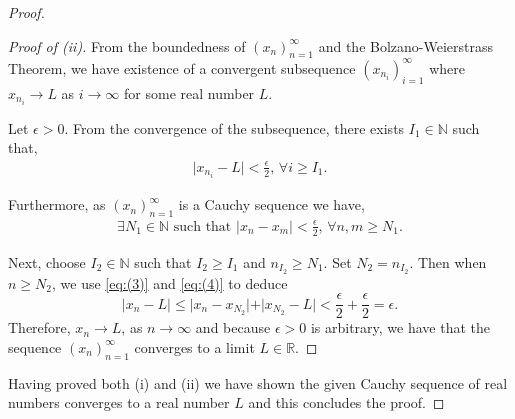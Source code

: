 \documentclass{article}
\begin{document}
\begin{proof}
\begin{proof}[Proof of (ii)]
From the boundedness of $(x_{n})_{n=1}^{\infty}$ and the Bolzano-Weierstrass Theorem, we have existence of a convergent subsequence $(x_{n_{i}})_{i=1}^{\infty}$ where $x_{n_{i}}\to L$ as $i\to\infty$ for some real number $L$. 

Let $\epsilon > 0$. From the convergence of the subsequence, there exists $I_{1}\in\mathbb{N}$ such that, 
\begin{align}
\vert x_{n_{i}}-L\vert<\frac{\epsilon}{2}\text{, }\forall i\geq I_{1}\text{.}\label{eq:(3)}\tag{3}
\end{align}

Furthermore, as $(x_{n})_{n=1}^{\infty}$ is a Cauchy sequence we have,
\begin{align}
\exists N_{1}\in\mathbb{N} \text{ such that } \vert x_{n}-x_{m}\vert< \frac{\epsilon}{2}\text{, } \forall n,m\geq N_{1}\text{.}\label{eq:(4)}\tag{4}
\end{align}

Next, choose $I_{2}\in\mathbb{N}$ such that $I_{2}\geq I_{1}$ and $n_{I_{2}}\geq N_{1}$. 
Set $N_{2}=n_{I_{2}}$. Then when $n\geq N_{2}$, we use \eqref{eq:(3)} and \eqref{eq:(4)} to deduce 
$$\vert x_{n}-L\vert\leq\vert x_{n}-x_{N_{2}}\vert + \vert x_{N_{2}}-L\vert < \frac{\epsilon}{2}+\frac{\epsilon}{2}=\epsilon\text{.}$$
Therefore, $x_n\to L$, as $n\to\infty$ and because $\epsilon >0$ is arbitrary, we have that the sequence  $(x_{n})_{n=1}^{\infty}$ converges to a limit $L\in\mathbb{R}$.
\end{proof}
Having proved both (i) and (ii) we have shown the given Cauchy sequence of real numbers converges to a real number $L$ and this concludes the proof.

\end{proof}
\end{document}
